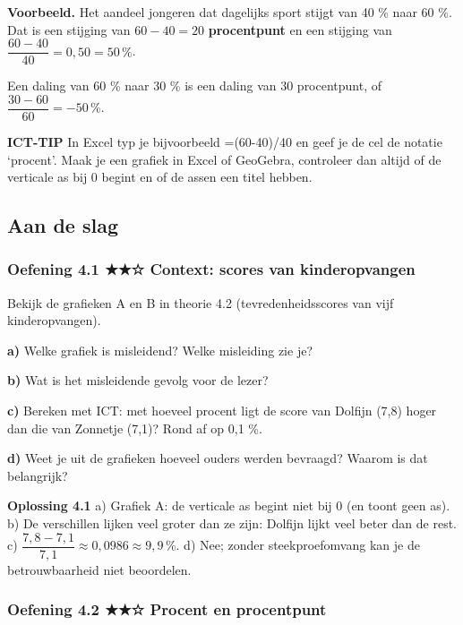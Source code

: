 \begin{voorbeeld}
\textbf{Voorbeeld.} Het aandeel jongeren dat dagelijks sport stijgt van 40 \% naar 60 \%. Dat is een stijging van $60-40=20$ \textbf{procentpunt} en een stijging van $\dfrac{60-40}{40}=0{,}50=50\,\%$.

Een daling van 60 \% naar 30 \% is een daling van 30 procentpunt, of $\dfrac{30-60}{60}=-50\,\%$.
\end{voorbeeld}

\begin{ict}
\textbf{ICT-TIP} \quad In Excel typ je bijvoorbeeld =(60-40)/40 en geef je de cel de notatie ‘procent’. Maak je een grafiek in Excel of GeoGebra, controleer dan altijd of de verticale as bij 0 begint en of de assen een titel hebben.
\end{ict}

\subsection*{Aan de slag}

\subsubsection*{Oefening 4.1 \quad ★★☆ \quad Context: scores van kinderopvangen}

Bekijk de grafieken A en B in theorie 4.2 (tevredenheidsscores van vijf kinderopvangen).

\textbf{a)} Welke grafiek is misleidend? Welke misleiding zie je? \lijn

\textbf{b)} Wat is het misleidende gevolg voor de lezer? \lijn

\textbf{c)} Bereken met ICT: met hoeveel procent ligt de score van Dolfijn (7,8) hoger dan die van Zonnetje (7,1)? Rond af op 0,1 \%. \lijn

\textbf{d)} Weet je uit de grafieken hoeveel ouders werden bevraagd? Waarom is dat belangrijk? \lijn

\begin{oplossing}
\textbf{Oplossing 4.1} \quad a) Grafiek A: de verticale as begint niet bij 0 (en toont geen as). b) De verschillen lijken veel groter dan ze zijn: Dolfijn lijkt veel beter dan de rest. c) $\dfrac{7{,}8-7{,}1}{7{,}1}\approx 0{,}0986\approx 9{,}9\,\%$. d) Nee; zonder steekproefomvang kan je de betrouwbaarheid niet beoordelen.
\end{oplossing}

\subsubsection*{Oefening 4.2 \quad ★★☆ \quad Procent en procentpunt}

